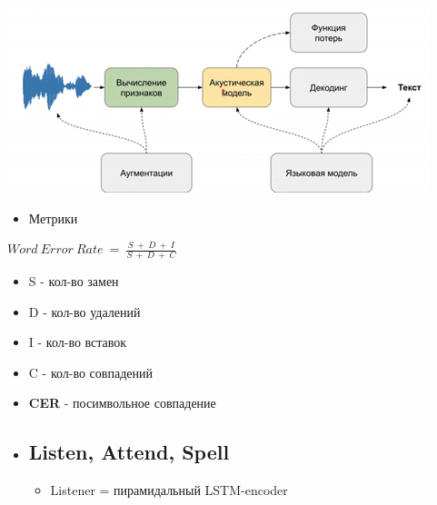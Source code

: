 \documentclass[a4paper, 12pt]{article}
\begin{document}
\includegraphics[width=4.84375in,height=2.12500in]{media/image5.png}

\begin{itemize}
\item
  
  {Метрики}
  
\end{itemize}

\(Word\ Error\ Rate\  = \ \frac{S\  + \ D\  + \ I}{S\  + \ D\  + \ C}\)

\begin{itemize}
\item
  
  S - кол-во замен
  
\item
  
  D - кол-во удалений
  
\item
  
  I - кол-во вставок
  
\item
  
  C - кол-во совпадений
  
\item
  
  \textbf{CER} - посимвольное совпадение
  
\end{itemize}

\begin{itemize}
\item \subsection{Listen, Attend, Spell}
  \begin{itemize}
  \item
    
    Listener = пирамидальный LSTM-encoder
    
  \end{itemize}
\end{itemize}
\end{document}

